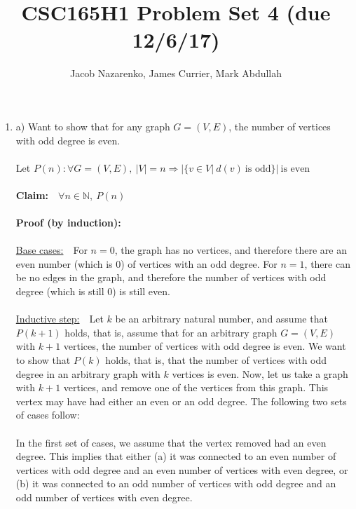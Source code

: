 \documentclass{article}
\title{CSC165H1 Problem Set 4 (due 12/6/17)}
\author{Jacob Nazarenko, James Currier, Mark Abdullah}
\newcommand{\N}{\mathbb{N}}
\begin{document}
\maketitle
\begin{enumerate}
	
	\item a) Want to show that for any graph $G=(V,E)$, the number of vertices with odd degree is even. \\\\
	Let $P(n): \forall G=(V,E),\ |V|=n \Rightarrow |\{v \in V |\ d(v)\ \text{is odd}\}|\ \text{is even}$ \\\\
	\textbf{Claim:}\ \ $\forall n \in \N,\ P(n)$ \\\\
	\textbf{Proof (by induction):}\\\\
	\underline{Base cases:}\ \ For $n=0$, the graph has no vertices, and therefore there are an even number (which is 0) of vertices with an odd degree. For $n=1$, there can be no edges in the graph, and therefore the number of vertices with odd degree (which is still 0) is still even. \\\\
	\underline{Inductive step:}\ \ Let $k$ be an arbitrary natural number, and assume that $P(k+1)$ holds, that is, assume that for an arbitrary graph $G=(V,E)$ with $k+1$ vertices, the number of vertices with odd degree is even. We want to show that $P(k)$ holds, that is, that the number of vertices with odd degree in an arbitrary graph with $k$ vertices is even. Now, let us take a graph with $k+1$ vertices, and remove one of the vertices from this graph. This vertex may have had either an even or an odd degree. The following two sets of cases follow:\\\\
	In the first set of cases, we assume that the vertex removed had an even degree. This implies that either (a) it was connected to an even number of vertices with odd degree and an even number of vertices with even degree, or (b) it was connected to an odd number of vertices with odd degree and an odd number of vertices with even degree. \\\\

\end{enumerate}
\end{document}
